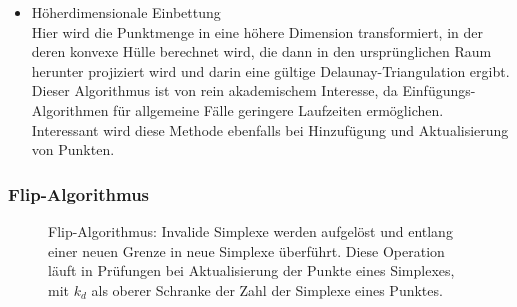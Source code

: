 \begin{itemize}
\item Höherdimensionale Einbettung\\
  Hier wird die Punktmenge in eine höhere Dimension transformiert, in der deren konvexe Hülle berechnet wird, die dann in den ursprünglichen Raum herunter projiziert wird und darin eine gültige Delaunay-Triangulation ergibt.
  Dieser Algorithmus ist von rein akademischem Interesse, da Einfügungs-Algorithmen für allgemeine Fälle geringere Laufzeiten ermöglichen.
  Interessant wird diese Methode ebenfalls bei Hinzufügung und Aktualisierung von Punkten.

\end{itemize}

\subsubsection{Flip-Algorithmus}

\begin{figure}
  \caption[Flip-Algorithmus]{
    Flip-Algorithmus: Invalide Simplexe werden aufgelöst und entlang einer neuen Grenze in neue Simplexe überführt.
    Diese Operation läuft in  Prüfungen bei Aktualisierung der Punkte eines Simplexes, mit $k_d$ als oberer Schranke der Zahl der Simplexe eines Punktes.
  }
  \label{fig:delaunay-flip}
\end{figure}

